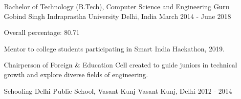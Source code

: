 
\begin{cventries}

  \cventry
    {Bachelor of Technology (B.Tech), Computer Science and Engineering} %
    {Guru Gobind Singh Indraprastha University} %
    {Delhi, India} %
    {March 2014 - June 2018} %
    {
      \begin{cvitems} %
        \item {Overall percentage: 80.71}
        \item {Mentor to college students participating in Smart India Hackathon, 2019.}
        \item {Chairperson of Foreign \& Education Cell created to guide juniors in technical growth and explore diverse fields of engineering.}
      \end{cvitems}
    }

  \cventry
    {Schooling} %
    {Delhi Public School, Vasant Kunj} %
    {Vasant Kunj, Delhi} %
    {2012 - 2014} %
    {
    }

\end{cventries}
